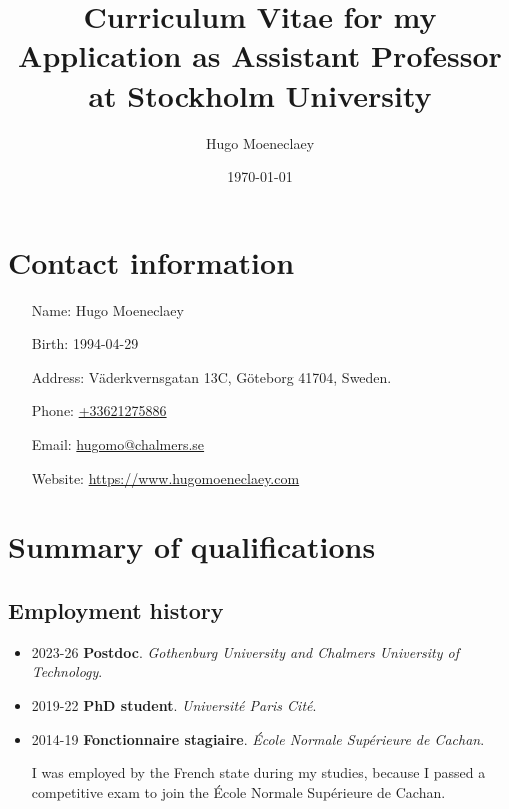 \documentclass{article}
\begin{document}
\title{Curriculum Vitae for my Application as Assistant Professor at Stockholm University}
\author{Hugo Moeneclaey}
\date{\today}

\newcommand{\cventry}[4]{\item[#1] \textbf{#2}. \emph{#3}.

{#4}}

\maketitle

\section*{Contact information}
\begin{itemize}
\item[Name:] Hugo Moeneclaey
\item[Birth:] 1994-04-29
\item[Address:] V\"aderkvernsgatan 13C, G\"oteborg 41704, Sweden.
\item[Phone:] \href{tel:+33621275886}{+33621275886}
\item[Email:] \href{mailto:hugomo@chalmers.se}{hugomo@chalmers.se}
\item[Website:] \url{https://www.hugomoeneclaey.com}
\end{itemize}


\section{Summary of qualifications}


\subsection{Employment history}
\begin{itemize}
\cventry{2023-26}{Postdoc}{Gothenburg University and Chalmers University of Technology}{}
\cventry{2019-22}{PhD student}{Universit\'e Paris Cit\'e}{}
\cventry{2014-19}{Fonctionnaire stagiaire}{\'Ecole Normale Sup\'erieure de Cachan}{
I was employed by the French state during my studies, because I passed a competitive exam to join the \'Ecole Normale Sup\'erieure de Cachan.}
\end{itemize}
\end{document}
